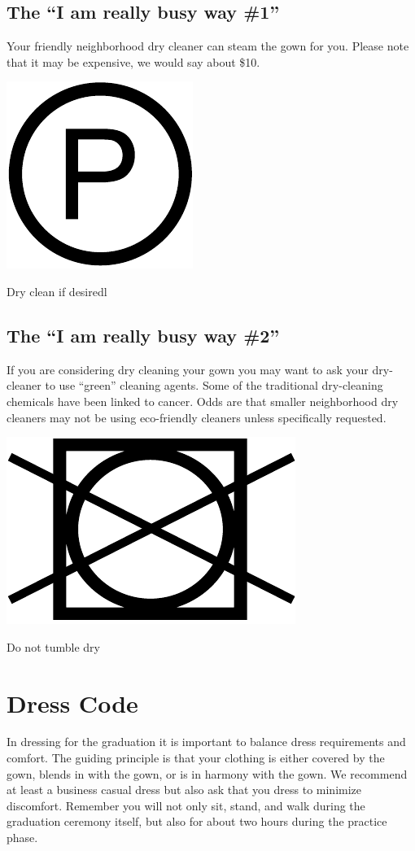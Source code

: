 \documentclass{tufte-handout}
\begin{document}
\subsection{The ``I am really busy way \#1''}
Your friendly neighborhood dry cleaner can steam the gown for you. Please note that it may be expensive, we would say about \$10.

\begin{marginfigure}[-2\baselineskip]%
\hspace*{0.07in}
  \includegraphics[width=.30\linewidth]{dry-clean}
  \caption{Dry clean if desiredl}
  \label{fig:dry-clean}
\end{marginfigure}

\subsection{The ``I am really busy way \#2''}
If you are considering dry cleaning your gown you may want to ask your dry-cleaner to use ``green'' cleaning agents. Some of the traditional dry-cleaning chemicals have been linked to cancer. Odds are that smaller neighborhood dry cleaners may not be using eco-friendly cleaners unless specifically requested.

\begin{marginfigure}[-7\baselineskip]%
\hspace*{0.01in}
  \includegraphics[width=.40\linewidth]{do-not-tumble}
  \caption{Do not tumble dry}
  \label{fig:tumble-dry}
\end{marginfigure}

\newpage
%
%
%
%

\section{Dress Code}
In dressing for the graduation it is important to balance dress requirements and comfort. The guiding principle is that your clothing is either covered by the gown, blends in with the gown, or is in harmony with the gown. We recommend at least a business casual dress but also ask that you dress to minimize discomfort. Remember you will not only sit, stand, and walk during the graduation ceremony itself, but also for about two hours during the practice phase. 
\end{document}
